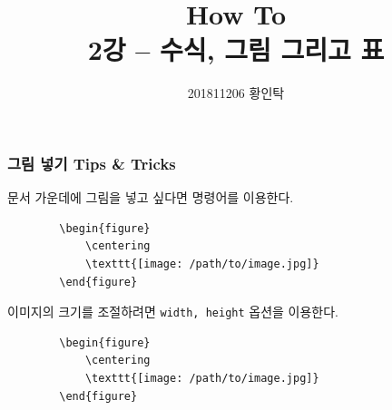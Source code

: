 

\title{How To \latex{} \\ \normalsize \textnormal{2강 -- 수식, 그림 그리고 표}}
\author{201811206 황인탁}


\maketitle


\begin{frame}[fragile]
    \frametitle{그림 넣기 Tips \& Tricks}

    문서 가운데에 그림을 넣고 싶다면 \texttt{\centering} 명령어를 이용한다.
    \begin{verbatim}
        \begin{figure}
            \centering
            \texttt{[image: /path/to/image.jpg]}
        \end{figure}
    \end{verbatim}

    이미지의 크기를 조절하려면 \texttt{width, height} 옵션을 이용한다.
    \begin{verbatim}
        \begin{figure}
            \centering
            \texttt{[image: /path/to/image.jpg]}
        \end{figure}
    \end{verbatim}

\end{frame}


